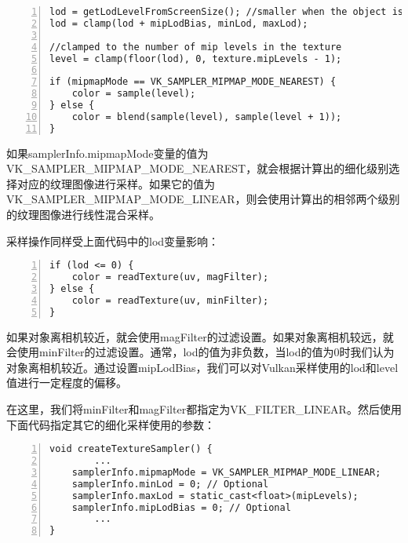 \documentclass{ctexart}
\begin{document}
\begin{lstlisting}[language={[ANSI]C},keywordstyle=\color{blue!70},commentstyle=\color{red!50!green!50!blue!50},frame=shadowbox, rulesepcolor=\color{red!20!green!20!blue!20},basicstyle=\small,numbers=left, numberstyle=\tiny,breaklines=true]
lod = getLodLevelFromScreenSize(); //smaller when the object is close, may be negative
lod = clamp(lod + mipLodBias, minLod, maxLod);

//clamped to the number of mip levels in the texture
level = clamp(floor(lod), 0, texture.mipLevels - 1);

if (mipmapMode == VK_SAMPLER_MIPMAP_MODE_NEAREST) {
	color = sample(level);
} else {
	color = blend(sample(level), sample(level + 1));
}
\end{lstlisting}

如果samplerInfo.mipmapMode变量的值为VK\_SAMPLER\_MIPMAP\_MODE\_NEAREST，就会根据计算出的细化级别选择对应的纹理图像进行采样。如果它的值为VK\_SAMPLER\_MIPMAP\_MODE\_LINEAR，则会使用计算出的相邻两个级别的纹理图像进行线性混合采样。

采样操作同样受上面代码中的lod变量影响：

\begin{lstlisting}[language={[ANSI]C},keywordstyle=\color{blue!70},commentstyle=\color{red!50!green!50!blue!50},frame=shadowbox, rulesepcolor=\color{red!20!green!20!blue!20},basicstyle=\small,numbers=left, numberstyle=\tiny,breaklines=true]
if (lod <= 0) {
	color = readTexture(uv, magFilter);
} else {
	color = readTexture(uv, minFilter);
}
\end{lstlisting}

如果对象离相机较近，就会使用magFilter的过滤设置。如果对象离相机较远，就会使用minFilter的过滤设置。通常，lod的值为非负数，当lod的值为0时我们认为对象离相机较近。通过设置mipLodBias，我们可以对Vulkan采样使用的lod和level值进行一定程度的偏移。

在这里，我们将minFilter和magFilter都指定为VK\_FILTER\_LINEAR。然后使用下面代码指定其它的细化采样使用的参数：

\begin{lstlisting}[language={[ANSI]C},keywordstyle=\color{blue!70},commentstyle=\color{red!50!green!50!blue!50},frame=shadowbox, rulesepcolor=\color{red!20!green!20!blue!20},basicstyle=\small,numbers=left, numberstyle=\tiny,breaklines=true]
void createTextureSampler() {
		...
	samplerInfo.mipmapMode = VK_SAMPLER_MIPMAP_MODE_LINEAR;
	samplerInfo.minLod = 0; // Optional
	samplerInfo.maxLod = static_cast<float>(mipLevels);
	samplerInfo.mipLodBias = 0; // Optional
		...
}
\end{lstlisting}
\end{document}
